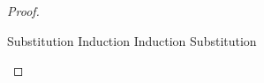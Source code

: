 \begin{proof}
\begin{itemize}
  \begin{eqnproof}[\interpC{\judgeC{\Gamma}{[e_2/x]c_1}{B}}\;\theta\;\gamma =]
           {Substitution}
           {Induction}
           {Induction}
           {Substitution}
  \end{eqnproof}

\end{itemize}
\end{proof}
